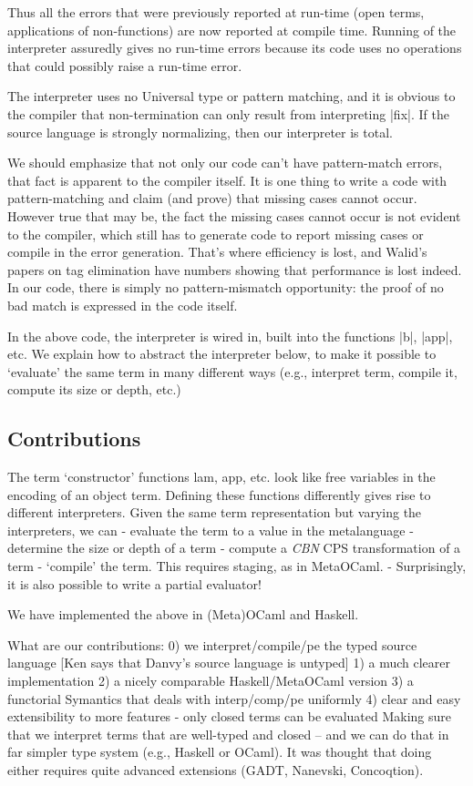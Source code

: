 \documentclass[preprint]{sigplanconf}
\begin{document}
Thus all the errors that were previously reported at run-time (open terms,
applications of non-functions) are now reported at compile
time. Running of the interpreter assuredly gives no run-time errors
because its code uses no operations that could possibly raise a
run-time error.



The interpreter uses no Universal type or pattern matching, and it
is obvious to the compiler that non-termination can only result from
interpreting |fix|.  If the source language is strongly normalizing, then
our interpreter is total.

We should emphasize that not only our code can't have pattern-match
errors, that fact is apparent to the compiler itself. It is one thing
to write a code with pattern-matching and claim (and prove) that
missing cases cannot occur. However true that may be, the fact the
missing cases cannot occur is not evident to the compiler, which still
has to generate code to report missing cases or compile in the error
generation. That's where efficiency is lost, and Walid's papers on tag
elimination have numbers showing that performance is lost indeed. 
In our code, there is simply no pattern-mismatch opportunity: the
proof of no bad match is expressed in the code itself. 


In the above code, the interpreter is wired in, built into the
functions |b|, |app|, etc. We explain how to abstract the interpreter
below, to make it possible to `evaluate' the same term in many different
ways (e.g., interpret term, compile it, compute its size or depth,
etc.)

\subsection{Contributions}
The term `constructor' functions lam, app, etc. look like free
variables in the encoding of an object term.  Defining these functions
differently gives rise to different interpreters.  Given the same term
representation but varying the interpreters, we can
	- evaluate the term to a value in the metalanguage
	- determine the size or depth of a term
        - compute a \emph{CBN} CPS transformation of a term
	- `compile' the term. This requires staging, as in MetaOCaml.
	- Surprisingly, it is also possible to write a partial
	evaluator! 

We have implemented the above in (Meta)OCaml and Haskell.

What are our contributions:
0) we interpret/compile/pe the typed source language
   [Ken says that Danvy's source language is untyped]
1) a much clearer implementation
2) a nicely comparable Haskell/MetaOCaml version
3) a functorial Symantics that deals with interp/comp/pe uniformly
4) clear and easy extensibility to more features
- only closed terms can be evaluated
Making sure that we interpret terms that are well-typed and closed --
and we can do that in far simpler type system (e.g., Haskell or
OCaml). It was thought that doing either requires quite advanced
extensions (GADT, Nanevski, Concoqtion).
\end{document}
